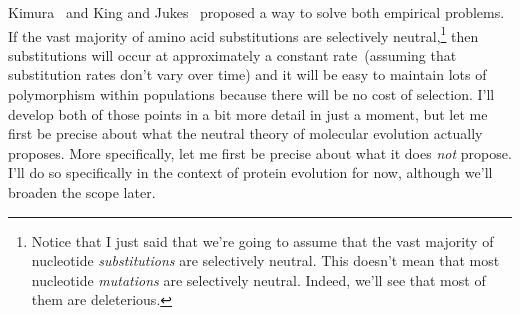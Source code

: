 \documentclass[12pt]{article}
\begin{document}
Kimura~\cite{Kimura68} and King and Jukes~\cite{King-Jukes69} proposed
a way to solve both empirical problems. If the vast majority of amino
acid substitutions are selectively neutral,\footnote{Notice that I
  just said that we're going to assume that the vast majority of
  nucleotide {\it substitutions\/} are selectively neutral. This
  doesn't mean that most nucleotide {\it mutations\/} are selectively
  neutral. Indeed, we'll see that most of them are deleterious.} then
substitutions will occur at approximately a constant rate~(assuming
that substitution rates don't vary over time) and it will be easy to
maintain lots of polymorphism within populations because there will be
no cost of selection. I'll develop both of those points in a bit more
detail in just a moment, but let me first be precise about what the
neutral theory of molecular evolution actually proposes. More
specifically, let me first be precise about what it does {\it not\/}
propose. I'll do so specifically in the context of protein evolution
for now, although we'll broaden the scope later.
\end{document}
